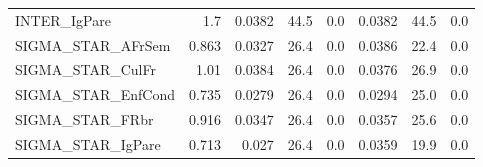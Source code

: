 \begin{tabular}{lrrrrrrr}
INTER\_IgPare       &    1.7 &   0.0382 &    44.5 &      0.0 &        0.0382 &         44.5 &           0.0 \\
SIGMA\_STAR\_AFrSem  &  0.863 &   0.0327 &    26.4 &      0.0 &        0.0386 &         22.4 &           0.0 \\
SIGMA\_STAR\_CulFr   &   1.01 &   0.0384 &    26.4 &      0.0 &        0.0376 &         26.9 &           0.0 \\
SIGMA\_STAR\_EnfCond &  0.735 &   0.0279 &    26.4 &      0.0 &        0.0294 &         25.0 &           0.0 \\
SIGMA\_STAR\_FRbr    &  0.916 &   0.0347 &    26.4 &      0.0 &        0.0357 &         25.6 &           0.0 \\
SIGMA\_STAR\_IgPare  &  0.713 &    0.027 &    26.4 &      0.0 &        0.0359 &         19.9 &           0.0 \\
\bottomrule
\end{tabular}

